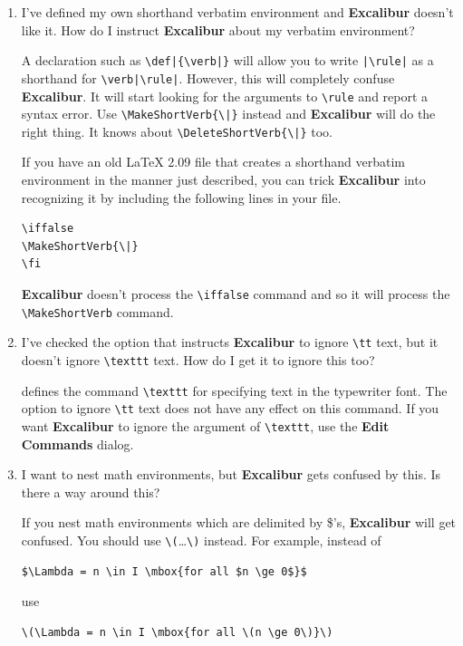 ﻿\documentclass[11pt,titlepage]{article}
\newcommand{\ex}{\textbf{Excalibur}}
\begin{document}
\begin{enumerate}
  If you are using version 2.3 or later, \ex{} will do a much better
  job of suggesting words if your dictionary has words stored using
  Apple's extended character set.

\item I've defined my own shorthand verbatim environment and \ex{} doesn't
  like it.  How do I instruct \ex{} about my verbatim environment?

  A declaration such as \verb+\def|{\verb|}+ will allow you to write
  \verb+|\rule|+ as a shorthand for \verb+\verb|\rule|+.  However,
  this will completely confuse \ex.  It will start looking for the
  arguments to \verb+\rule+ and report a syntax error.  Use
  \verb+\MakeShortVerb{\|}+ instead and \ex{} will do the right thing.
  It knows about \verb+\DeleteShortVerb{\|}+ too.

  If you have an old \LaTeX{} 2.09 file that creates a shorthand
  verbatim environment in the manner just described, you can trick
  \ex{} into recognizing it by including the following lines in your
  file.
\begin{verbatim}
\iffalse
\MakeShortVerb{\|}
\fi
\end{verbatim}
  \ex{} doesn't process the \verb+\iffalse+ command and so it will
  process the \verb+\MakeShortVerb+ command.

\item I've checked the option that instructs \ex{} to ignore
  \verb+\tt+ text, but it doesn't ignore \verb+\texttt+ text.  How do
  I get it to ignore this too?

  \LaTeXe{} defines the command \verb+\texttt+ for specifying text in
  the typewriter font.  The option to ignore \verb+\tt+ text does not
  have any effect on this command.  If you want \ex{} to ignore the
  argument of \verb+\texttt+, use the \textbf{Edit Commands} dialog.

\item I want to nest math environments, but \ex{} gets confused by
  this.  Is there a way around this?

  If you nest math environments which are delimited by \$'s, \ex{}
  will get confused.  You should use \verb+\(+\ldots\verb+\)+ instead.
  For example, instead of
\begin{verbatim}
$\Lambda = n \in I \mbox{for all $n \ge 0$}$
\end{verbatim}
use
\begin{verbatim}
\(\Lambda = n \in I \mbox{for all \(n \ge 0\)}\)
\end{verbatim}


\end{enumerate}
\end{document}
